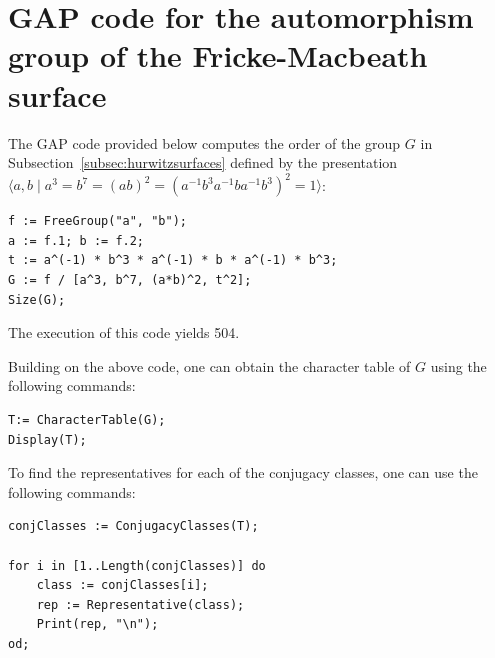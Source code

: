 \section{GAP code for the automorphism group of the Fricke-Macbeath surface}\label{sec:appB}
The GAP code provided below computes the order of the group $G$ in Subsection~\ref{subsec:hurwitzsurfaces} defined by the presentation
$\langle a, b \mid a^{3} = b^{7} = (ab)^{2} = (a^{-1} b^3 a^{-1} b a^{-1} b^3)^2 = 1\rangle$:
\begin{lstlisting}[label=lst:gapcode, frame=single]
f := FreeGroup("a", "b");
a := f.1; b := f.2;
t := a^(-1) * b^3 * a^(-1) * b * a^(-1) * b^3;
G := f / [a^3, b^7, (a*b)^2, t^2];
Size(G);
\end{lstlisting}
The execution of this code yields 504.

Building on the above code, one can obtain the character table of $G$ using the following commands:
\begin{lstlisting}[frame=single]
T:= CharacterTable(G);
Display(T);
\end{lstlisting}

To find the representatives for each of the conjugacy classes, one can use the following commands:
\begin{lstlisting}[frame=single]
conjClasses := ConjugacyClasses(T);

for i in [1..Length(conjClasses)] do
    class := conjClasses[i];
    rep := Representative(class);
    Print(rep, "\n");  
od;
\end{lstlisting}
